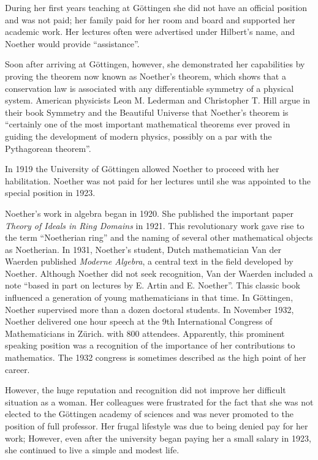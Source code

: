 \documentclass{article}
\begin{document}
During her first years teaching at Göttingen she did not have an official position and was not paid; her family paid for her room and board and supported her academic work. Her lectures often were advertised under Hilbert's name, and Noether would provide ``assistance''.

Soon after arriving at Göttingen, however, she demonstrated her capabilities by proving the theorem now known as Noether's theorem, which shows that a conservation law is associated with any differentiable symmetry of a physical system. American physicists Leon M. Lederman and Christopher T. Hill argue in their book Symmetry and the Beautiful Universe that Noether's theorem is ``certainly one of the most important mathematical theorems ever proved in guiding the development of modern physics, possibly on a par with the Pythagorean theorem''.

In 1919 the University of Göttingen allowed Noether to proceed with her habilitation. Noether was not paid for her lectures until she was appointed to the special position in 1923.

Noether's work in algebra began in 1920. She published the important paper {\em Theory of Ideals in Ring Domains} in 1921. This revolutionary work gave rise to the term ``Noetherian ring'' and the naming of several other mathematical objects as Noetherian. In 1931, Noether's student, Dutch mathematician Van der Waerden published {\em Moderne Algebra}, a central text in the field developed by Noether. Although Noether did not seek recognition, Van der Waerden included a note ``based in part on lectures by E. Artin and E. Noether''. This classic book influenced a generation of young mathematicians in that time. In Göttingen, Noether supervised more than a dozen doctoral students. In November 1932, Noether delivered one hour speech at the 9th International Congress of Mathematicians in Zürich. with 800 attendees. Apparently, this prominent speaking position was a recognition of the importance of her contributions to mathematics. The 1932 congress is sometimes described as the high point of her career.

However, the huge reputation and recognition did not improve her difficult situation as a woman. Her colleagues were frustrated for the fact that she was not elected to the Göttingen academy of sciences and was never promoted to the position of full professor. Her frugal lifestyle was due to being denied pay for her work; However, even after the university began paying her a small salary in 1923, she continued to live a simple and modest life.
\end{document}
